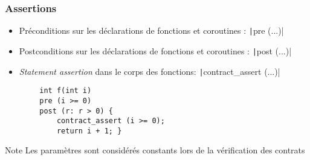 \documentclass[C++.tex]{subfiles}
\begin{document}
\begin{frame}[fragile]
	\frametitle{Assertions}
	\begin{itemize}
		\item Préconditions sur les déclarations de fonctions et coroutines : \texttt|pre (...)|
		\item Postconditions sur les déclarations de fonctions et coroutines : \texttt|post (...)|
		\item \textit{Statement assertion} dans le corps des fonctions: \texttt|contract_assert (...)|
	\end{itemize}

	\begin{verbatim}
		int f(int i)
		pre (i >= 0)
		post (r: r > 0) {
			contract_assert (i >= 0);
			return i + 1; }
	\end{verbatim}

	\begin{block}{Note}
		Les paramètres sont considérés constants lors de la vérification des contrats
	\end{block}


\end{frame}
\end{document}
